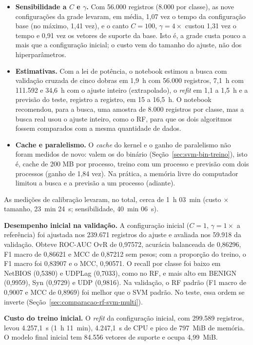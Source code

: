 \documentclass[
    12pt,                %
    openright,           %
    oneside,             %
    a4paper,             %
    english,             %
    brazil               %
]{abntex2}
\begin{document}
\begin{itemize}
\item \textbf{Sensibilidade a $C$ e $\gamma$.} Com 56.000 registros (8.000 por classe), as nove configurações da grade levaram, em média, 1,07 vez o tempo da configuração base (no máximo, 1,41 vez), e o canto $C = 100$, $\gamma = 4\times$ custou 1,31 vez o tempo e 0,91 vez os vetores de suporte da base. Isto é, a grade custa pouco a mais que a configuração inicial; o custo vem do tamanho do ajuste, não dos hiperparâmetros.
\item \textbf{Estimativas.} Com a lei de potência, o notebook estimou a busca com validação cruzada de cinco dobras em 1,9~h com 56.000 registros, 7,1~h com 111.592 e 34,6~h com o ajuste inteiro (extrapolado), o \textit{refit} em 1,1 a 1,5~h e a previsão do teste, registro a registro, em 15 a 16,5~h. O notebook recomendou, para a busca, uma amostra de 8.000 registros por classe, mas a busca real usou o ajuste inteiro, como o RF, para que os dois algoritmos fossem comparados com a mesma quantidade de dados.
\item \textbf{Cache e paralelismo.} O \textit{cache} do kernel e o ganho de paralelismo não foram medidos de novo: valem os do binário (Seção~\ref{sec:svm-bin-treino}), isto é, cache de 200 MB por processo, treino com um processo e previsão com dois processos (ganho de 1,84 vez). Na prática, a memória livre do computador limitou a busca e a previsão a um processo (adiante).
\end{itemize}
 
As medições de calibração levaram, no total, cerca de 1~h 03~min (custo $\times$ tamanho, 23~min 24~s; sensibilidade, 40~min 06~s).
 
\textbf{Desempenho inicial na validação.} A configuração inicial ($C = 1$, $\gamma = 1\times$ a referência) foi ajustada nos 239.671 registros do ajuste e avaliada nos 59.918 da validação. Obteve ROC-AUC OvR de 0,97572, acurácia balanceada de 0,86296, F1 macro de 0,86621 e MCC de 0,87212 sem pesos; com a proporção do treino, o F1 macro foi 0,83907 e o MCC, 0,90571. O recall por classe foi baixo em NetBIOS (0,5380) e UDPLag (0,7033), como no RF, e mais alto em BENIGN (0,9959), Syn (0,9729) e UDP (0,9816). Na validação, o RF padrão (F1 macro de 0,9007 e MCC de 0,8969) foi melhor que o SVM padrão. No teste, essa ordem se inverte (Seção~\ref{sec:comparacao-rf-svm-multi}).
 
\textbf{Custo do treino inicial.} O \textit{refit} da configuração inicial, com 299.589 registros, levou 4.257,1~s (1~h 11~min), 4.247,1~s de CPU e pico de 797~MiB de memória. O modelo final inicial tem 84.556 vetores de suporte e ocupa 4,99~MiB.
 
\end{document}
